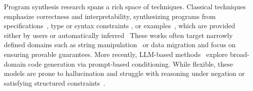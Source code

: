 \documentclass[a4paper,twoside,12pt]{report} %
\begin{document}

Program synthesis research spans a rich space of techniques.
Classical techniques emphasize correctness and
interpretability, synthesizing programs from specifications~\cite{alur2013syntax, feser2015synthesizing, gulwani2011automating,leino2016dafny},
type or syntax constraints \cite{polikarpova2016program,reynolds2019syguscomp},
or examples~\cite{jha2010oracle, raza2018disjunctive, singh2016blinkfill,wu2023programming},
which are provided either by users or automatically inferred~\cite{cambronero2019active,harp:ccs:2021}
These works often target narrowly
defined domains such as string manipulation~\cite{harp:ccs:2021} or data migration
\cite{yaghmazadeh2018automated} and focus on ensuring provable guarantees.
More recently, LLM-based methods~\cite{austin2021program, chen2021evaluating}
explore broad-domain code generation via prompt-based conditioning.
While flexible, these models are prone to hallucination and struggle
with reasoning under negation or satisfying structured constraints~\cite{xu2023llmfoolitselfpromptbased, wu2023deceptpromptexploitingllmdrivencode,jiang2024llmsdreamelephantswhen,hwang2024thinkpinkelephant}.
\end{document}

